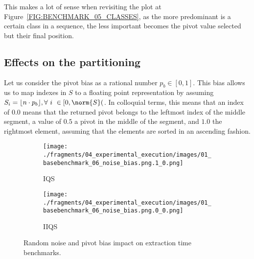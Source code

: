 This makes a lot of sense when revisiting the plot at Figure~\ref{FIG:BENCHMARK_05_CLASSES}, as the more predominant is a certain class in a sequence, the less important becomes the pivot value selected but their final position.\\

\subsection{Effects on the partitioning}

Let us consider the pivot bias as a rational number $p_b \in [0,1]$. This bias allows us to map indexes in $S$ to a floating point representation by assuming $S_i = \lfloor n\cdot p_{b}  \rfloor, \forall ~i~ \in[0,\norm{S}($. In colloquial terms, this means that an index of $0.0$ means that the returned pivot belongs to the leftmost index of the middle segment, a value of $0.5$ a pivot in the middle of the segment, and $1.0$ the rightmost element, assuming that the elements are sorted in an ascending fashion.\\

\begin{figure}
    \centering
    \begin{subfigure}[b]{0.45\textwidth}
        \centering
        \texttt{[image: ./fragments/04\_experimental\_execution/images/01\_basebenchmark\_06\_noise\_bias.png.1\_0.png]}
        \caption{IQS}
        \label{FIG:BENCHMARK_06_NOISE_BIAS__0_0}
    \end{subfigure}
    \hfill
    \begin{subfigure}[b]{0.45\textwidth}
        \centering
        \texttt{[image: ./fragments/04\_experimental\_execution/images/01\_basebenchmark\_06\_noise\_bias.png.0\_0.png]}
        \caption{IIQS}
        \label{FIG:BENCHMARK_06_NOISE_BIAS__0_1}
    \end{subfigure}

    \caption{Random noise and pivot bias impact on extraction time benchmarks.}
    \label{FIG:BENCHMARK_06_NOISE_BIAS}
\end{figure}

